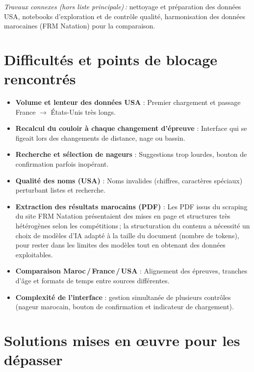 \documentclass[11pt,a4paper]{article}
\begin{document}
\noindent\textit{Travaux connexes (hors liste principale)\,:} nettoyage et préparation des données USA, notebooks d'exploration et de contrôle qualité, harmonisation des données marocaines (FRM Natation) pour la comparaison.

\section{Difficultés et points de blocage rencontrés}

\begin{itemize}
  \item \textbf{Volume et lenteur des données USA} : Premier chargement et passage France $\rightarrow$ États-Unis très longs.
  \item \textbf{Recalcul du couloir à chaque changement d'épreuve} : Interface qui se figeait lors des changements de distance, nage ou bassin.
  \item \textbf{Recherche et sélection de nageurs} : Suggestions trop lourdes, bouton de confirmation parfois inopérant.
  \item \textbf{Qualité des noms (USA)} : Noms invalides (chiffres, caractères spéciaux) perturbant listes et recherche.
  \item \textbf{Extraction des résultats marocains (PDF)} : Les PDF issus du scraping du site FRM Natation présentaient des mises en page et structures très hétérogènes selon les compétitions\,; la structuration du contenu a nécessité un choix de modèles d'IA adapté à la taille du document (nombre de tokens), pour rester dans les limites des modèles tout en obtenant des données exploitables.
  \item \textbf{Comparaison Maroc\,/\,France\,/\,USA} : Alignement des épreuves, tranches d'âge et formats de temps entre sources différentes.
  \item \textbf{Complexité de l'interface} : gestion simultanée de plusieurs contrôles (nageur marocain, bouton de confirmation et indicateur de chargement).


\end{itemize}

\section{Solutions mises en œuvre pour les dépasser}
\end{document}
